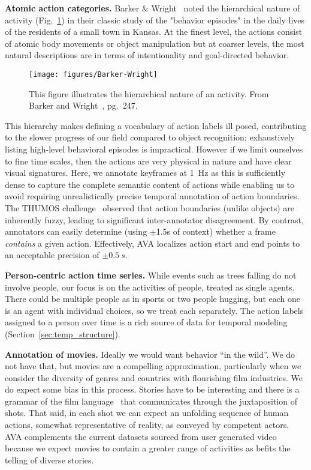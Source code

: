 \documentclass[10pt,twocolumn,letterpaper]{article}
\begin{document}
\noindent \textbf{Atomic action categories.} Barker \& Wright~\cite{Barker1954} noted the hierarchical nature of activity (Fig.~\ref{fig:barker-wright}) in their classic study of the "behavior episodes" in the daily lives of the residents of a small town in Kansas.  At the finest level, the actions consist of atomic body movements or object manipulation but at coarser levels, the most natural descriptions are in terms of intentionality and goal-directed behavior. 

\begin{figure}[t]
\vspace{-0.5em}
\centerline{\texttt{[image: figures/Barker-Wright]}}
\vspace{-0.5em}
\caption{This figure illustrates the hierarchical nature of an activity. From Barker and Wright~\cite{Barker1954}, pg.~247.}
\label{fig:barker-wright}
\vspace{-1em}
\end{figure}

This hierarchy makes defining a vocabulary of action labels ill posed, contributing to the slower progress of our field compared to object recognition; exhaustively listing high-level behavioral episodes is impractical. However if we limit ourselves to fine time scales, then the actions are very physical in nature and have clear visual signatures. Here, we annotate keyframes at 1~Hz as this is sufficiently dense to capture the complete semantic content of actions while enabling us to avoid requiring unrealistically precise temporal annotation of action boundaries. The THUMOS challenge~\cite{THUMOS} observed that action boundaries (unlike objects) are inherently fuzzy, leading to significant inter-annotator disagreement. By contrast, annotators can easily determine (using $\pm$1.5s of context) whether a frame \emph{contains} a given action. Effectively, AVA localizes action start and end points to an acceptable precision of $\pm 0.5~s$.

\noindent \textbf{Person-centric action time series.} While events such as trees falling do not involve people, our focus is on the activities of people, treated as single agents. There could be multiple people as in sports or two people hugging, but each one is an agent with individual choices, so we treat each separately. The action labels assigned to a person over time is a rich source of data for temporal modeling (Section~\ref{sec:temp_structure}).

\noindent \textbf{Annotation of movies.} Ideally we would want behavior ``in the wild''. We do not have that, but movies are a compelling approximation, particularly when we consider the diversity of genres and countries with flourishing film industries. We do expect some bias in this process. Stories have to be interesting and there is a grammar of the film language~\cite{Arijon1991} that communicates through the juxtaposition of shots. That said, in each shot we can expect an unfolding sequence of human actions, somewhat representative of reality, as conveyed by competent actors. AVA complements the current datasets sourced from user generated video because we expect movies to contain a greater range of activities as befits the telling of diverse stories.
\end{document}
